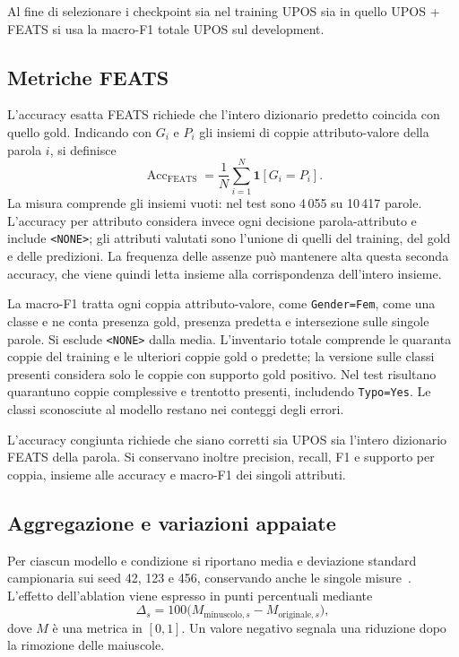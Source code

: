 \documentclass[12pt,a4paper]{report}
\begin{document}
Al fine di selezionare i checkpoint sia nel training UPOS sia in quello UPOS + FEATS si usa la macro-F1 totale UPOS sul development.

\subsection{Metriche FEATS}
\label{sec:feats-metrics}
L'accuracy esatta FEATS richiede che l'intero dizionario predetto coincida con quello gold. Indicando con $G_i$ e $P_i$ gli insiemi di coppie attributo-valore della parola $i$, si definisce
\begin{equation}
\operatorname{Acc}_{\mathrm{FEATS}}=\frac{1}{N}\sum_{i=1}^{N}\mathbf{1}[G_i=P_i].
\end{equation}
La misura comprende gli insiemi vuoti: nel test sono 4\,055 su 10\,417 parole. L'accuracy per attributo considera invece ogni decisione parola-attributo e include \texttt{<NONE>}; gli attributi valutati sono l'unione di quelli del training, del gold e delle predizioni. La frequenza delle assenze può mantenere alta questa seconda accuracy, che viene quindi letta insieme alla corrispondenza dell'intero insieme.

La macro-F1 tratta ogni coppia attributo-valore, come \texttt{Gender=Fem}, come una classe e ne conta presenza gold, presenza predetta e intersezione sulle singole parole. Si esclude \texttt{<NONE>} dalla media. L'inventario totale comprende le quaranta coppie del training e le ulteriori coppie gold o predette; la versione sulle classi presenti considera solo le coppie con supporto gold positivo. Nel test risultano quarantuno coppie complessive e trentotto presenti, includendo \texttt{Typo=Yes}. Le classi sconosciute al modello restano nei conteggi degli errori.

L'accuracy congiunta richiede che siano corretti sia UPOS sia l'intero dizionario FEATS della parola. Si conservano inoltre precision, recall, F1 e supporto per coppia, insieme alle accuracy e macro-F1 dei singoli attributi.

\subsection{Aggregazione e variazioni appaiate}
Per ciascun modello e condizione si riportano media e deviazione standard campionaria sui seed 42, 123 e 456, conservando anche le singole misure~\cite{seeds}. L'effetto dell'ablation viene espresso in punti percentuali mediante
\begin{equation}
\Delta_{s}=100\bigl(M_{\mathrm{minuscolo},s}-M_{\mathrm{originale},s}\bigr),
\end{equation}
dove $M$ è una metrica in $[0,1]$. Un valore negativo segnala una riduzione dopo la rimozione delle maiuscole.
\end{document}
